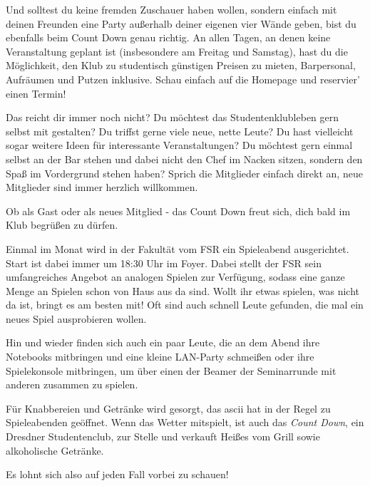 Und solltest du keine fremden Zuschauer haben wollen, sondern einfach mit deinen Freunden eine Party außerhalb deiner eigenen vier Wände geben, bist du ebenfalls beim Count Down genau richtig.
An allen Tagen, an denen keine Veranstaltung geplant ist (insbesondere am Freitag und Samstag), hast du die Möglichkeit, den Klub zu studentisch günstigen Preisen zu mieten, Barpersonal, Aufräumen und Putzen inklusive.
Schau einfach auf die Homepage und reservier' einen Termin!

Das reicht dir immer noch nicht?
Du möchtest das Studentenklubleben gern selbst mit gestalten?
Du triffst gerne viele neue, nette Leute?
Du hast vielleicht sogar weitere Ideen für interessante Veranstaltungen?
Du möchtest gern einmal selbst an der Bar stehen und dabei nicht den Chef im Nacken sitzen, sondern den Spaß im Vordergrund stehen haben?
Sprich die Mitglieder einfach direkt an, neue Mitglieder sind immer herzlich willkommen.

Ob als Gast oder als neues Mitglied - das Count Down freut sich, dich bald im Klub begrüßen zu dürfen.


Einmal im Monat wird in der Fakultät vom FSR ein Spieleabend ausgerichtet. Start ist dabei immer um 18:30 Uhr im Foyer. Dabei stellt der FSR sein umfangreiches Angebot an analogen Spielen zur Verfügung, sodass eine ganze Menge an Spielen schon von Haus aus da sind. Wollt ihr etwas spielen, was nicht da ist, bringt es am besten mit! Oft sind auch schnell Leute gefunden, die mal ein neues Spiel ausprobieren wollen.

Hin und wieder finden sich auch ein paar Leute, die an dem Abend ihre Notebooks mitbringen und eine kleine LAN-Party schmeißen oder ihre Spielekonsole mitbringen, um über einen der Beamer der Seminarrunde mit anderen zusammen zu spielen.

Für Knabbereien und Getränke wird gesorgt, das ascii hat in der Regel zu Spieleabenden geöffnet. Wenn das Wetter mitspielt, ist auch das \emph{Count Down}, ein Dresdner Studentenclub, zur Stelle und verkauft Heißes vom Grill sowie alkoholische Getränke.

Es lohnt sich also auf jeden Fall vorbei zu schauen!

\pagebreak

\
\thispagestyle{empty}
